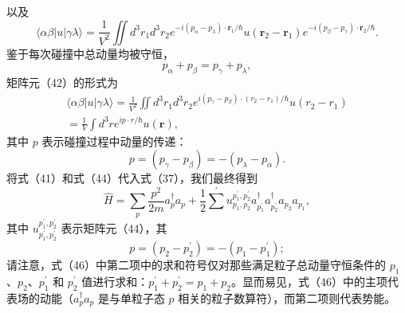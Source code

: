 以及
\begin{equation}\tag{11.1.53}\label{eq:11.1.53}
\langle \alpha \beta | u | \gamma \lambda \rangle = \frac { 1 } { V ^{2} } \iint d ^{3} r _ { 1 } d ^{3} r _ { 2 } e ^{- i ( p _ { \alpha} - p _ { \lambda } ) \cdot \mathbf { r } _ { 1 } / \hbar } u ( \mathbf { r } _ { 2 } - \mathbf { r } _ { 1 } ) e ^{- i ( p _ { \beta} - p _ { \gamma } ) \cdot \mathbf { r } _ { 2 } / \hbar } .
\end{equation}
鉴于每次碰撞中总动量均被守恒，
\begin{equation}\tag{11.1.54}\label{eq:11.1.54}
p _ { \alpha } + p _ { \beta } = p _ { \gamma } + p _ { \lambda } ,
\end{equation}
矩阵元（42）的形式为
\begin{equation}\tag{11.1.55}\label{eq:11.1.55}
\begin{array}{r} { \langle \alpha \beta | u | \gamma \lambda \rangle = \frac { 1 } { V ^{2} } \iint d ^{3} r _ { 1 } d ^{3} r _ { 2 } e ^{i ( p _ { \gamma} - p _ { \beta } ) \cdot ( r _ { 2 } - r _ { 1 } ) / \hbar } u ( r _ { 2 } - r _ { 1 } ) } \\{ = \frac { 1 } { V } \int d ^{3} r e ^{i p \cdot r / \hbar} u ( \mathbf { r } ) , } \end{array}
\end{equation}
其中 \(p\) 表示碰撞过程中动量的传递：
\begin{equation}\tag{11.1.56}\label{eq:11.1.56}
p = ( p _ { \gamma } - p _ { \beta } ) = - ( p _ { \lambda } - p _ { \alpha } ) .
\end{equation}
将式（41）和式（44）代入式（37），我们最终得到
\begin{equation}\tag{11.1.57}\label{eq:11.1.57}
\hat { H } = \sum _ { p } \frac { p ^{2} } { 2 m } a _ { p } ^{\dagger} a _ { p } + \frac { 1 } { 2 } \sum ^{\prime} u _ { p _ { 1 } , p _ { 2 } } ^{p _ { 1} ^{\prime} , p _ { 2 } ^{\prime} } a _ { p _ { 1 } ^{\prime} } ^{\dagger} a _ { p _ { 2 } ^{\prime} } ^{\dagger} a _ { p _ { 2 } } a _ { p _ { 1 } } ,
\end{equation}
其中 \(u_{p_{1}^{'},p_{2}^{'}}^{p_{1}^{'},p_{2}^{'}}\) 表示矩阵元（44），其
\begin{equation}\tag{11.1.58}\label{eq:11.1.58}
p = ( p _ { 2 } - p _ { 2 } ^{\prime} ) = - ( p _ { 1 } - p _ { 1 } ^{\prime} ) ;
\end{equation}
请注意，式（46）中第二项中的求和符号仅对那些满足粒子总动量守恒条件的 \(p_{1}\)、\(p_{2}\)、\(p_{1}^{\prime}\) 和 \(p_{2}^{\prime}\) 值进行求和：\(p_{1}^{\prime} + p_{2}^{\prime} = p_{1} + p_{2}\)。显而易见，式（46）中的主项代表场的动能（\(a_{p}^{\dagger}a_{p}\) 是与单粒子态 \(p\) 相关的粒子数算符），而第二项则代表势能。
